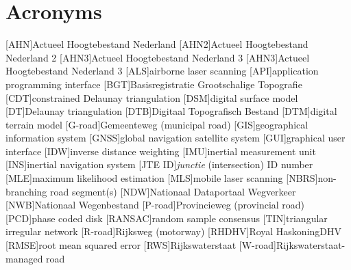 \chapter*{Acronyms}

\begin{acronym}[UML]
  [AHN]{Actueel Hoogtebestand Nederland}
  [AHN2]{Actueel Hoogtebestand Nederland 2}
  [AHN3]{Actueel Hoogtebestand Nederland 3}
  [AHN3]{Actueel Hoogtebestand Nederland 3}
  [ALS]{airborne laser scanning}
  [API]{application programming interface}
  [BGT]{Basisregistratie Grootschalige Topografie}
  [CDT]{constrained Delaunay triangulation}
  [DSM]{digital surface model}
  [DT]{Delaunay triangulation}
  [DTB]{Digitaal Topografisch Bestand}
  [DTM]{digital terrain model}
  [G-road]{Gemeenteweg (municipal road)}
  [GIS]{geographical information system}
  [GNSS]{global navigation satellite system}
  [GUI]{graphical user interface}
  [IDW]{inverse distance weighting}
  [IMU]{inertial measurement unit}
  [INS]{inertial navigation system}
  [JTE ID]{\textit{junctie} (intersection) ID number}
  [MLE]{maximum likelihood estimation}
  [MLS]{mobile laser scanning}
  [NBRS]{non-branching road segment(s)}
  [NDW]{Nationaal Dataportaal Wegverkeer}
  [NWB]{Nationaal Wegenbestand}
  [P-road]{Provincieweg (provincial road)}
  [PCD]{phase coded disk}
  [RANSAC]{random sample consensus}
  [TIN]{triangular irregular network}
  [R-road]{Rijksweg (motorway)}
  [RHDHV]{Royal HaskoningDHV}
  [RMSE]{root mean squared error}
  [RWS]{Rijkswaterstaat}
  [W-road]{Rijkswaterstaat-managed road}
\end{acronym}